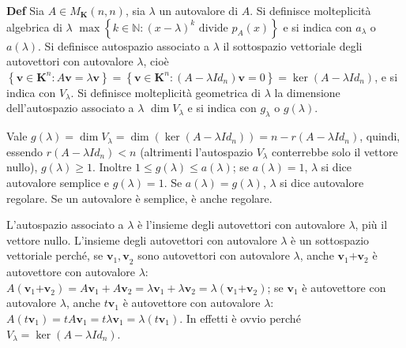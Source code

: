 \documentclass{article}
\begin{document}
\textbf{Def} Sia $A\in M_{\mathbf{K}}\left( n,n\right) $, sia $\lambda $ un
autovalore di $A$. Si definisce molteplicit\`{a} algebrica di $\lambda $ $%
\max \left\{ k\in 
\mathbb{N}
:\left( x-\lambda \right) ^{k}\text{ divide }p_{A}\left( x\right) \right\} $
e si indica con $a_{\lambda }$ o $a\left( \lambda \right) $. Si definisce
autospazio associato a $\lambda $ il sottospazio vettoriale degli
autovettori con autovalore $\lambda $, cio\`{e} $\left\{ \mathbf{v}\in 
\mathbf{K}^{n}:A\mathbf{v}=\lambda \mathbf{v}\right\} =\left\{ \mathbf{v}\in 
\mathbf{K}^{n}:\left( A-\lambda Id_{n}\right) \mathbf{v}=0\right\} =\ker
\left( A-\lambda Id_{n}\right) $, e si indica con $V_{\lambda }$. Si
definisce molteplicit\`{a} geometrica di $\lambda $ la dimensione
dell'autospazio associato a $\lambda $ $\dim V_{\lambda }$ e si indica con $%
g_{\lambda }$ o $g\left( \lambda \right) $.

Vale $g\left( \lambda \right) =\dim V_{\lambda }=\dim \left( \ker \left(
A-\lambda Id_{n}\right) \right) =n-r\left( A-\lambda Id_{n}\right) $,
quindi, essendo $r\left( A-\lambda Id_{n}\right) <n$ (altrimenti
l'autospazio $V_{\lambda }$ conterrebbe solo il vettore nullo), $g\left(
\lambda \right) \geq 1$. Inoltre $1\leq g\left( \lambda \right) \leq a\left(
\lambda \right) $; se $a\left( \lambda \right) =1$, $\lambda $ si dice
autovalore semplice e $g\left( \lambda \right) =1$. Se $a\left( \lambda
\right) =g\left( \lambda \right) $, $\lambda $ si dice autovalore regolare.
Se un autovalore \`{e} semplice, \`{e} anche regolare.

L'autospazio associato a $\lambda $ \`{e} l'insieme degli autovettori con
autovalore $\lambda $, pi\`{u} il vettore nullo. L'insieme degli autovettori
con autovalore $\lambda $ \`{e} un sottospazio vettoriale perch\'{e}, se $%
\mathbf{v}_{1}\mathbf{,v}_{2}$ sono autovettori con autovalore $\lambda $,
anche $\mathbf{v}_{1}\mathbf{+v}_{2}$ \`{e} autovettore con autovalore $%
\lambda $: $A\left( \mathbf{v}_{1}\mathbf{+v}_{2}\right) =A\mathbf{v}_{1}+A%
\mathbf{v}_{2}=\lambda \mathbf{v}_{1}+\lambda \mathbf{v}_{2}=\lambda \left( 
\mathbf{v}_{1}\mathbf{+v}_{2}\right) $; se $\mathbf{v}_{1}$ \`{e}
autovettore con autovalore $\lambda $, anche $t\mathbf{v}_{1}$ \`{e}
autovettore con autovalore $\lambda $: $A\left( t\mathbf{v}_{1}\right) =tA%
\mathbf{v}_{1}=t\lambda \mathbf{v}_{1}=\lambda \left( t\mathbf{v}_{1}\right) 
$. In effetti \`{e} ovvio perch\'{e} $V_{\lambda }=\ker \left( A-\lambda
Id_{n}\right) $.
\end{document}
